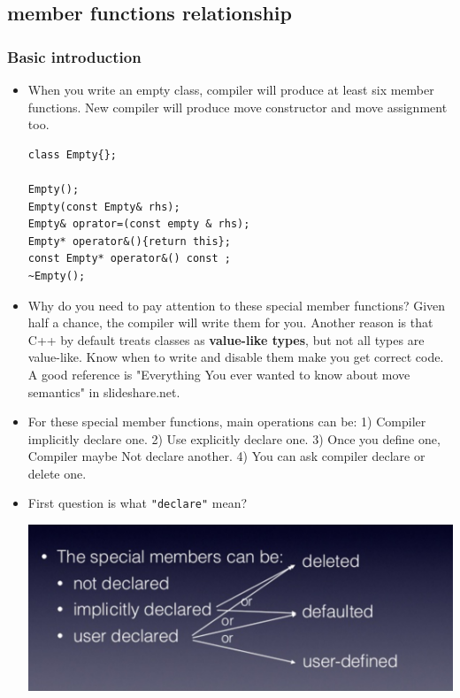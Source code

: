 \documentclass[a4paper,11pt,twoside]{book}
\begin{document}
\subsection{member functions relationship}

\subsubsection{Basic introduction}

\begin{itemize}

\item When you write an empty class, compiler will produce at least six member functions.  New compiler will produce move constructor and move assignment too.
\begin{lstlisting}[numbers=none]
class Empty{};

Empty();
Empty(const Empty& rhs);
Empty& oprator=(const empty & rhs);
Empty* operator&(){return this};
const Empty* operator&() const ;
~Empty();
\end{lstlisting}

\item Why do you need to pay attention to these special member functions?  Given half a chance, the compiler will write them for you. Another reason is that C++ by default treats classes as \textbf{value-like types}, but not all types are value-like. Know when to write and disable them make you get correct code. A good reference is "Everything You ever wanted to know about move semantics" in slideshare.net.

\item For these special member functions, main operations can be: 1) Compiler implicitly declare one.
2) Use explicitly declare one.
3) Once you define one, Compiler maybe Not declare another.
4) You can ask compiler declare or delete one.


\item First question is what \texttt{"declare"} mean?  
\begin{center}
	\includegraphics[scale=0.6]{pics/sm1.png} 
\end{center}



\end{itemize}
\end{document}
